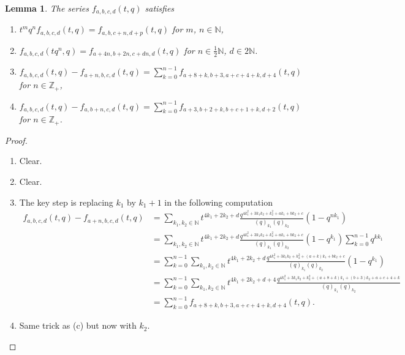 \documentclass[12pt, a4paper]{article}
\newtheorem{lemma}[theorem]{Lemma}
\theoremstyle{remark}
\begin{document}
\begin{lemma}
  \label{lmm:1}
  The series $f_{a, b, c, d}(t, q)$ satisfies
  \begin{enumerate}[label={(\alph*)}]
  \item $t^mq^nf_{a, b, c, d}(t, q) = f_{a, b, c + n, d + p}(t, q)$ for $m$, $n \in \mathbb{N}$,
  \item $f_{a, b, c, d}(tq^n, q) = f_{a + 4n, b + 2n, c + dn, d}(t, q)$ for $n \in \frac{1}{2}\mathbb{N}$, $d \in 2\mathbb{N}$.
  \item $f_{a, b, c, d}(t, q) - f_{a + n, b, c, d}(t, q) = \sum_{k = 0}^{n - 1}f_{a + 8 + k, b + 3, a + c + 4 + k, d + 4}(t, q)$ for $n \in \mathbb{Z}_+$,
  \item $f_{a, b, c, d}(t, q) - f_{a, b + n, c, d}(t, q) = \sum_{k = 0}^{n - 1}f_{a + 3, b + 2 + k, b + c + 1 + k, d + 2}(t, q)$ for $n \in \mathbb{Z}_+$.
  \end{enumerate}
\end{lemma}

\begin{proof}
  \begin{enumerate}[label=(\alph*)]
  \item Clear.
  \item Clear.
  \item The key step is replacing $k_1$ by $k_1 + 1$ in the following computation
    \begin{align*}
      f_{a, b, c, d}(t, q) - f_{a + n, b, c, d}(t, q) &= \sum_{k_1, k_2 \in \mathbb{N}}t^{4k_1 + 2k_2 + d}\frac{q^{4k_1^2 + 3k_1k_2 + k_2^2 + ak_1 + bk_2 + c}}{(q)_{k_1}(q)_{k_2}}(1 - q^{nk_1}) \\
      &= \sum_{k_1, k_2 \in \mathbb{N}}t^{4k_1 + 2k_2 + d}\frac{q^{4k_1^2 + 3k_1k_2 + k_2^2 + ak_1 + bk_2 + c}}{(q)_{k_1}(q)_{k_2}}(1 - q^{k_1})\sum_{k = 0}^{n - 1}q^{kk_1} \\
      &= \sum_{k = 0}^{n - 1}\sum_{k_1, k_2 \in \mathbb{N}}t^{4k_1 + 2k_2 + d}\frac{q^{4k_1^2 + 3k_1k_2 + k_2^2 + (a + k)k_1 + bk_2 + c}}{(q)_{k_1}(q)_{k_2}}(1 - q^{k_1}) \\
      &= \sum_{k = 0}^{n - 1}\sum_{k_1, k_2 \in \mathbb{N}}t^{4k_1 + 2k_2 + d + 4}\frac{q^{4k_1^2 + 3k_1k_2 + k_2^2 + (a + 8 + k)k_1 + (b + 3)k_2 + a + c + 4 + k}}{(q)_{k_1}(q)_{k_2}} \\
      &= \sum_{k = 0}^{n - 1}f_{a + 8 + k, b + 3, a + c + 4 + k, d + 4}(t, q).
    \end{align*}
  \item Same trick as (c) but now with $k_2$.
  \end{enumerate}
\end{proof}
\end{document}
